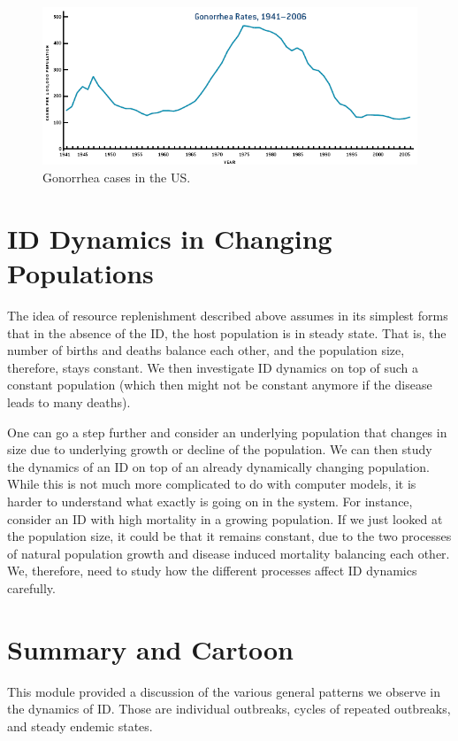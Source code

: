 \documentclass[]{book}
\theoremstyle{definition}
\theoremstyle{definition}
\theoremstyle{definition}
\theoremstyle{remark}
\begin{document}
\begin{figure}
\centering
\includegraphics{./images/gonorrhea.png}
\caption{\label{fig:gonorrheapattern}Gonorrhea cases in the US.}
\end{figure}

\section{ID Dynamics in Changing
Populations}\label{id-dynamics-in-changing-populations}

The idea of resource replenishment described above assumes in its
simplest forms that in the absence of the ID, the host population is in
steady state. That is, the number of births and deaths balance each
other, and the population size, therefore, stays constant. We then
investigate ID dynamics on top of such a constant population (which then
might not be constant anymore if the disease leads to many deaths).

One can go a step further and consider an underlying population that
changes in size due to underlying growth or decline of the population.
We can then study the dynamics of an ID on top of an already dynamically
changing population. While this is not much more complicated to do with
computer models, it is harder to understand what exactly is going on in
the system. For instance, consider an ID with high mortality in a
growing population. If we just looked at the population size, it could
be that it remains constant, due to the two processes of natural
population growth and disease induced mortality balancing each other.
We, therefore, need to study how the different processes affect ID
dynamics carefully.

\section{Summary and Cartoon}\label{summary-and-cartoon-2}

This module provided a discussion of the various general patterns we
observe in the dynamics of ID. Those are individual outbreaks, cycles of
repeated outbreaks, and steady endemic states.
\end{document}
